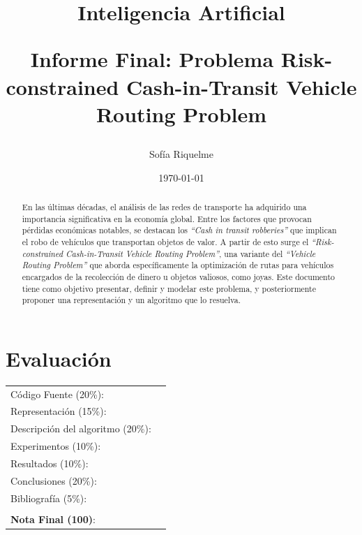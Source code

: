 \documentclass{article}
\begin{document}
\title{Inteligencia Artificial \\ \begin{Large}Informe Final: Problema Risk-constrained Cash-in-Transit Vehicle Routing Problem\end{Large}}
\author{Sofía Riquelme}
\date{\today}
\maketitle


\section*{Evaluaci\'on}

\begin{tabular}{ll}
C\'odigo Fuente (20\%): &  \underline{\hspace{2cm}}\\
Representaci\'on (15\%):  & \underline{\hspace{2cm}} \\
Descripci\'on del algoritmo (20\%):  & \underline{\hspace{2cm}} \\
Experimentos (10\%):  & \underline{\hspace{2cm}} \\
Resultados (10\%):  & \underline{\hspace{2cm}} \\
Conclusiones (20\%): &  \underline{\hspace{2cm}}\\
Bibliograf\'ia (5\%): & \underline{\hspace{2cm}}\\
 &  \\
\textbf{Nota Final (100)}:   & \underline{\hspace{2cm}}
\end{tabular}

\begin{abstract}
    En las últimas décadas, el análisis de las redes de transporte ha adquirido una importancia significativa en la economía global. Entre los factores que provocan pérdidas económicas notables, se destacan los \textit{``Cash in transit robberies''} que implican el robo de vehículos que transportan objetos de valor. A partir de esto surge el \textit{``Risk-constrained Cash-in-Transit Vehicle Routing Problem''}, una variante del \textit{``Vehicle Routing Problem''} que aborda específicamente la optimización de rutas para vehículos encargados de la recolección de dinero u objetos valiosos, como joyas. Este documento tiene como objetivo presentar, definir y modelar este problema, y posteriormente proponer una representación y un algoritmo que lo resuelva.
\end{abstract}
\end{document}
